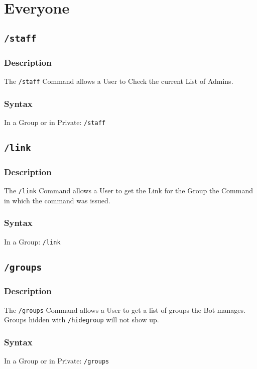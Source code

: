 \documentclass[a4paper]{article}
\begin{document}
\section{Everyone}
    \subsection{\texttt{/staff}}
        \subsubsection*{Description}
            The \texttt{/staff} Command allows a User to Check the current List of Admins.

        \subsubsection*{Syntax}
            In a Group or in Private: \texttt{/staff}\\

    \subsection{\texttt{/link}}
        \subsubsection*{Description}
            The \texttt{/link} Command allows a User to get the Link for the Group the Command in which the command was issued.

        \subsubsection*{Syntax}
            In a Group: \texttt{/link}\\
\newpage
    \subsection{\texttt{/groups}}
        \subsubsection*{Description}
            The \texttt{/groups} Command allows a User to get a list of groups the Bot manages. Groups hidden with \texttt{/hidegroup} will not show up.

        \subsubsection*{Syntax}
            In a Group or in Private: \texttt{/groups}\\
\end{document}
